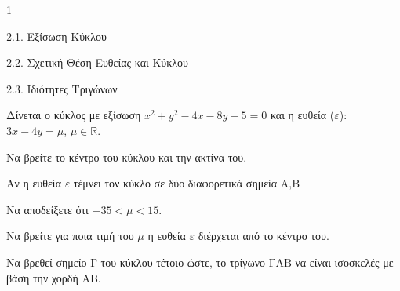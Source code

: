 \begin{ylh}{1}
    \item 2.1. Εξίσωση Κύκλου
    \item 2.2. Σχετική Θέση Ευθείας και Κύκλου
    \item 2.3. Ιδιότητες Τριγώνων
\end{ylh}

Δίνεται ο κύκλος με εξίσωση $x^2+y^2-4x-8y-5=0$ και η ευθεία ($\varepsilon$): $3x-4y=\mu$, $\mu\in\mathbb{R}$.
\begin{alist}
\item Να βρείτε το κέντρο του κύκλου και την ακτίνα του. 
\item Αν η ευθεία $\varepsilon$ τέμνει τον κύκλο σε δύο διαφορετικά σημεία $\text{A}, \text{B}$
    \begin{rlist}
    \item Να αποδείξετε ότι $-35<\mu<15$. 
    \item Να βρείτε για ποια τιμή του $\mu$ η ευθεία $\varepsilon$ διέρχεται από το κέντρο του. 
    \item Να βρεθεί σημείο $\text{Γ}$ του κύκλου τέτοιο ώστε, το τρίγωνο $\text{ΓAB}$ να είναι ισοσκελές με βάση την χορδή $\text{AB}$. 
    \end{rlist}
\end{alist}